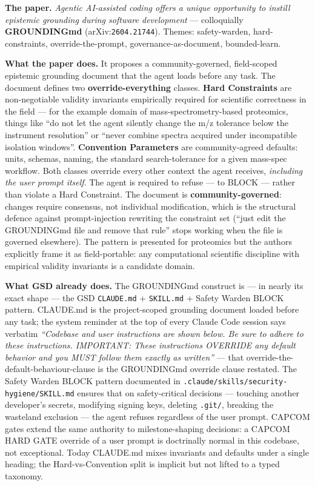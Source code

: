 \documentclass[11pt,letterpaper]{article}
\newcommand{\arxivid}[1]{\texttt{\textcolor{accent}{#1}}}
\begin{document}
\textbf{The paper.} \emph{Agentic AI-assisted coding offers a unique
opportunity to instill epistemic grounding during software development}
--- colloquially \textbf{GROUNDINGmd} (arXiv:\arxivid{2604.21744}). Themes:
safety-warden, hard-constraints, override-the-prompt,
governance-as-document, bounded-learn.

\textbf{What the paper does.} It proposes a community-governed,
field-scoped epistemic grounding document that the agent loads before
any task. The document defines two \textbf{override-everything} classes.
\textbf{Hard Constraints} are non-negotiable validity invariants
empirically required for scientific correctness in the field --- for the
example domain of mass-spectrometry-based proteomics, things like ``do
not let the agent silently change the m/z tolerance below the instrument
resolution'' or ``never combine spectra acquired under incompatible
isolation windows''. \textbf{Convention Parameters} are community-agreed
defaults: units, schemas, naming, the standard search-tolerance for a
given mass-spec workflow. Both classes override every other context the
agent receives, \emph{including the user prompt itself}. The agent is
required to refuse --- to BLOCK --- rather than violate a Hard
Constraint. The document is \textbf{community-governed}: changes require
consensus, not individual modification, which is the structural defence
against prompt-injection rewriting the constraint set (``just edit the
GROUNDINGmd file and remove that rule'' stops working when the file is
governed elsewhere). The pattern is presented for proteomics but the
authors explicitly frame it as field-portable: any computational
scientific discipline with empirical validity invariants is a candidate
domain.

\textbf{What GSD already does.} The GROUNDINGmd construct is --- in
nearly its exact shape --- the GSD \texttt{CLAUDE.md} +
\texttt{SKILL.md} + Safety Warden BLOCK pattern. CLAUDE.md is the
project-scoped grounding document loaded before any task; the system
reminder at the top of every Claude Code session says verbatim
\emph{``Codebase and user instructions are shown below. Be sure to
adhere to these instructions. IMPORTANT: These instructions OVERRIDE any
default behavior and you MUST follow them exactly as written''} --- that
override-the-default-behaviour-clause is the GROUNDINGmd override clause
restated. The Safety Warden BLOCK pattern documented in
\texttt{.claude/skills/security-hygiene/SKILL.md} ensures that on
safety-critical decisions --- touching another developer's secrets,
modifying signing keys, deleting \texttt{.git/}, breaking the wasteland
exclusion --- the agent refuses regardless of the user prompt. CAPCOM
gates extend the same authority to milestone-shaping decisions: a CAPCOM
HARD GATE override of a user prompt is doctrinally normal in this
codebase, not exceptional. Today CLAUDE.md mixes invariants and defaults
under a single heading; the Hard-vs-Convention split is implicit but not
lifted to a typed taxonomy.
\end{document}
